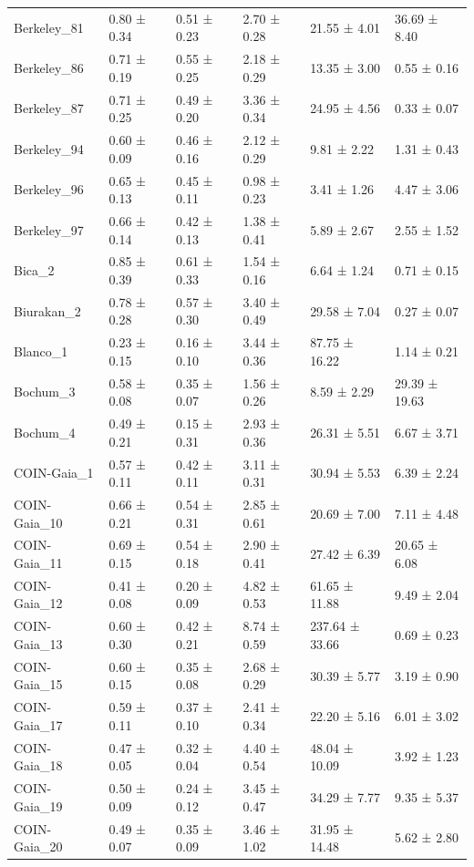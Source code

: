 \begin{tabular}{llllll}
Berkeley_81 & 0.80 ± 0.34 & 0.51 ± 0.23 & 2.70 ± 0.28 & 21.55 ± 4.01 & 36.69 ± 8.40 \\
Berkeley_86 & 0.71 ± 0.19 & 0.55 ± 0.25 & 2.18 ± 0.29 & 13.35 ± 3.00 & 0.55 ± 0.16 \\
Berkeley_87 & 0.71 ± 0.25 & 0.49 ± 0.20 & 3.36 ± 0.34 & 24.95 ± 4.56 & 0.33 ± 0.07 \\
Berkeley_94 & 0.60 ± 0.09 & 0.46 ± 0.16 & 2.12 ± 0.29 & 9.81 ± 2.22 & 1.31 ± 0.43 \\
Berkeley_96 & 0.65 ± 0.13 & 0.45 ± 0.11 & 0.98 ± 0.23 & 3.41 ± 1.26 & 4.47 ± 3.06 \\
Berkeley_97 & 0.66 ± 0.14 & 0.42 ± 0.13 & 1.38 ± 0.41 & 5.89 ± 2.67 & 2.55 ± 1.52 \\
Bica_2 & 0.85 ± 0.39 & 0.61 ± 0.33 & 1.54 ± 0.16 & 6.64 ± 1.24 & 0.71 ± 0.15 \\
Biurakan_2 & 0.78 ± 0.28 & 0.57 ± 0.30 & 3.40 ± 0.49 & 29.58 ± 7.04 & 0.27 ± 0.07 \\
Blanco_1 & 0.23 ± 0.15 & 0.16 ± 0.10 & 3.44 ± 0.36 & 87.75 ± 16.22 & 1.14 ± 0.21 \\
Bochum_3 & 0.58 ± 0.08 & 0.35 ± 0.07 & 1.56 ± 0.26 & 8.59 ± 2.29 & 29.39 ± 19.63 \\
Bochum_4 & 0.49 ± 0.21 & 0.15 ± 0.31 & 2.93 ± 0.36 & 26.31 ± 5.51 & 6.67 ± 3.71 \\
COIN-Gaia_1 & 0.57 ± 0.11 & 0.42 ± 0.11 & 3.11 ± 0.31 & 30.94 ± 5.53 & 6.39 ± 2.24 \\
COIN-Gaia_10 & 0.66 ± 0.21 & 0.54 ± 0.31 & 2.85 ± 0.61 & 20.69 ± 7.00 & 7.11 ± 4.48 \\
COIN-Gaia_11 & 0.69 ± 0.15 & 0.54 ± 0.18 & 2.90 ± 0.41 & 27.42 ± 6.39 & 20.65 ± 6.08 \\
COIN-Gaia_12 & 0.41 ± 0.08 & 0.20 ± 0.09 & 4.82 ± 0.53 & 61.65 ± 11.88 & 9.49 ± 2.04 \\
COIN-Gaia_13 & 0.60 ± 0.30 & 0.42 ± 0.21 & 8.74 ± 0.59 & 237.64 ± 33.66 & 0.69 ± 0.23 \\
COIN-Gaia_15 & 0.60 ± 0.15 & 0.35 ± 0.08 & 2.68 ± 0.29 & 30.39 ± 5.77 & 3.19 ± 0.90 \\
COIN-Gaia_17 & 0.59 ± 0.11 & 0.37 ± 0.10 & 2.41 ± 0.34 & 22.20 ± 5.16 & 6.01 ± 3.02 \\
COIN-Gaia_18 & 0.47 ± 0.05 & 0.32 ± 0.04 & 4.40 ± 0.54 & 48.04 ± 10.09 & 3.92 ± 1.23 \\
COIN-Gaia_19 & 0.50 ± 0.09 & 0.24 ± 0.12 & 3.45 ± 0.47 & 34.29 ± 7.77 & 9.35 ± 5.37 \\
COIN-Gaia_20 & 0.49 ± 0.07 & 0.35 ± 0.09 & 3.46 ± 1.02 & 31.95 ± 14.48 & 5.62 ± 2.80 \\

\end{tabular}
